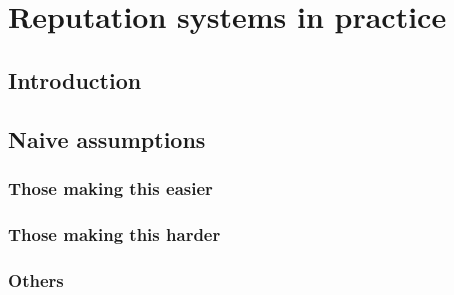 \chapter{Reputation systems in practice}
\section{Introduction}

\section{Naive assumptions}
\subsection{Those making this easier}

\subsection{Those making this harder}

\subsection{Others}
